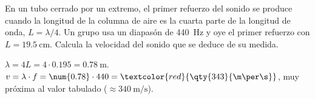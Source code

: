 \begin{exercise}
    En un tubo cerrado por un extremo, el primer refuerzo del sonido se produce cuando la longitud de la columna de aire es la cuarta parte de la longitud de onda, \(L = \lambda/4\). Un grupo usa un diapasón de \qty{440}{\hertz} y oye el primer refuerzo con \(L = \qty{19.5}{\cm}\). Calcula la velocidad del sonido que se deduce de su medida.
    \begin{solu}
        \(\lambda = 4L = 4 \cdot \num{0.195} = \qty{0.78}{\m}\). \(v = \lambda \cdot f = \num{0.78} \cdot 440 = \textcolor{red}{\qty{343}{\m\per\s}}\), muy próxima al valor tabulado (\(\approx \qty{340}{\m\per\s}\)).
    \end{solu}
\end{exercise}
